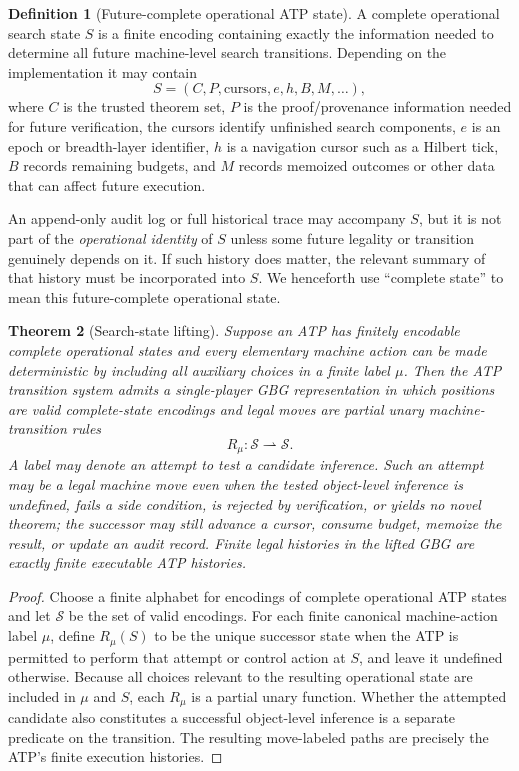 \documentclass[11pt]{article}
\newtheorem{theorem}{Theorem}[section]
\theoremstyle{definition}
\newtheorem{definition}[theorem]{Definition}
\begin{document}
\begin{definition}[Future-complete operational ATP state]\label{def:complete-state}
A complete operational search state $S$ is a finite encoding containing exactly the information needed to determine all future machine-level search transitions. Depending on the implementation it may contain
\[
S=(C,P,\text{cursors},e,h,B,M,\ldots),
\]
where $C$ is the trusted theorem set, $P$ is the proof/provenance information needed for future verification, the cursors identify unfinished search components, $e$ is an epoch or breadth-layer identifier, $h$ is a navigation cursor such as a Hilbert tick, $B$ records remaining budgets, and $M$ records memoized outcomes or other data that can affect future execution.

An append-only audit log or full historical trace may accompany $S$, but it is not part of the \emph{operational identity} of $S$ unless some future legality or transition genuinely depends on it. If such history does matter, the relevant summary of that history must be incorporated into $S$. We henceforth use ``complete state'' to mean this future-complete operational state.
\end{definition}

\begin{theorem}[Search-state lifting]\label{thm:lifting}
Suppose an ATP has finitely encodable complete operational states and every elementary machine action can be made deterministic by including all auxiliary choices in a finite label $\mu$. Then the ATP transition system admits a single-player GBG representation in which positions are valid complete-state encodings and legal moves are partial unary machine-transition rules
\[
R_\mu:\mathcal S\rightharpoonup\mathcal S.
\]
A label may denote an \emph{attempt} to test a candidate inference. Such an attempt may be a legal machine move even when the tested object-level inference is undefined, fails a side condition, is rejected by verification, or yields no novel theorem; the successor may still advance a cursor, consume budget, memoize the result, or update an audit record. Finite legal histories in the lifted GBG are exactly finite executable ATP histories.
\end{theorem}

\begin{proof}
Choose a finite alphabet for encodings of complete operational ATP states and let $\mathcal S$ be the set of valid encodings. For each finite canonical machine-action label $\mu$, define $R_\mu(S)$ to be the unique successor state when the ATP is permitted to perform that attempt or control action at $S$, and leave it undefined otherwise. Because all choices relevant to the resulting operational state are included in $\mu$ and $S$, each $R_\mu$ is a partial unary function. Whether the attempted candidate also constitutes a successful object-level inference is a separate predicate on the transition. The resulting move-labeled paths are precisely the ATP's finite execution histories.
\end{proof}
\end{document}
